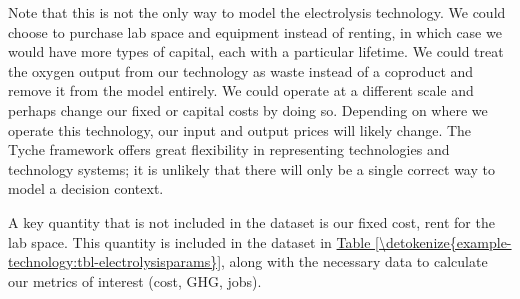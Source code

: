 \documentclass[letterpaper,10pt,english]{sphinxmanual}
\begin{document}
Note that this is not the only way to model the electrolysis technology. We could choose to purchase lab space and equipment instead of renting, in which case we would have more types of capital, each with a particular lifetime. We could treat the oxygen output from our technology as waste instead of a coproduct and remove it from the model entirely. We could operate at a different scale and perhaps change our fixed or capital costs by doing so. Depending on where we operate this technology, our input and output prices will likely change. The Tyche framework offers great flexibility in representing technologies and technology systems; it is unlikely that there will only be a single correct way to model a decision context.

A key quantity that is not included in the  dataset is our fixed cost, rent for the lab space. This quantity is included in the  dataset in \hyperref[\detokenize{example-technology:tbl-electrolysisparams}]{Table \ref{\detokenize{example-technology:tbl-electrolysisparams}}}, along with the necessary data to calculate our metrics of interest (cost, GHG, jobs).
\end{document}
